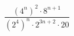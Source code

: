 \begin{ex}[type=expression]
	\begin{condition}
		\( \dfrac{(4^n)^2\cdot8^{n+1}}{(2^4)^n\cdot2^{3n+2}\cdot20} \)
	\end{condition}
\end{ex}